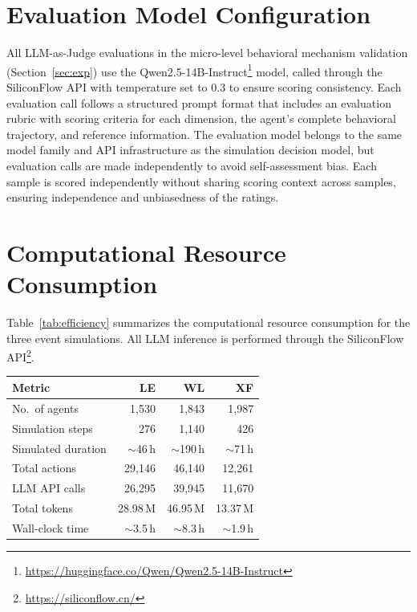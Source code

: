 \documentclass[a4paper,fleqn]{cas-dc}
\begin{document}
\section{Evaluation Model Configuration}

All LLM-as-Judge evaluations in the micro-level behavioral mechanism validation (Section~\ref{sec:exp}) use the Qwen2.5-14B-Instruct\footnote{\url{https://huggingface.co/Qwen/Qwen2.5-14B-Instruct}} model, called through the SiliconFlow API with temperature set to 0.3 to ensure scoring consistency. Each evaluation call follows a structured prompt format that includes an evaluation rubric with scoring criteria for each dimension, the agent's complete behavioral trajectory, and reference information. The evaluation model belongs to the same model family and API infrastructure as the simulation decision model, but evaluation calls are made independently to avoid self-assessment bias. Each sample is scored independently without sharing scoring context across samples, ensuring independence and unbiasedness of the ratings.

\section{Computational Resource Consumption}
\label{app:efficiency}

Table~\ref{tab:efficiency} summarizes the computational resource consumption for the three event simulations. All LLM inference is performed through the SiliconFlow API\footnote{\url{https://siliconflow.cn/}}. 

\noindent
\begin{minipage}[t]{\columnwidth}
\centering
{}
\label{tab:efficiency}
\small
\renewcommand{\arraystretch}{1.15}
\begin{tabular*}{\columnwidth}{@{\extracolsep{\fill}}lrrr@{}}
\toprule
\textbf{Metric} & \textbf{LE} & \textbf{WL} & \textbf{XF} \\
\midrule
No.\ of agents & 1,530 & 1,843 & 1,987 \\
Simulation steps & 276 & 1,140 & 426 \\
Simulated duration & $\sim$46\,h & $\sim$190\,h & $\sim$71\,h \\
Total actions & 29,146 & 46,140 & 12,261 \\
LLM API calls & 26,295 & 39,945 & 11,670 \\
Total tokens & 28.98\,M & 46.95\,M & 13.37\,M \\
Wall-clock time & $\sim$3.5\,h & $\sim$8.3\,h & $\sim$1.9\,h \\
\bottomrule
\end{tabular*}
\end{minipage}
\end{document}
